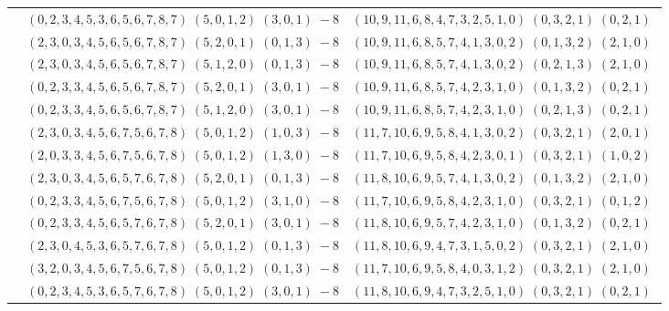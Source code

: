 \documentclass[11pt]{article}
\begin{document}
\begin{longtable}[l]{|c|c|c|}
 \cline{2-3} 
 & $(0 ,2 ,3 ,4 ,5 ,3 ,6 ,5 ,6 ,7 ,8 ,7) \;(5 ,0 ,1 ,2) \;(3 ,0 ,1) \;-8$ & $(10 ,9 ,11 ,6 ,8 ,4 ,7 ,3 ,2 ,5 ,1 ,0) \;(0 ,3 ,2 ,1) \;(0 ,2 ,1) \;$\\ 
 \cline{2-3} 
 & $(2 ,3 ,0 ,3 ,4 ,5 ,6 ,5 ,6 ,7 ,8 ,7) \;(5 ,2 ,0 ,1) \;(0 ,1 ,3) \;-8$ & $(10 ,9 ,11 ,6 ,8 ,5 ,7 ,4 ,1 ,3 ,0 ,2) \;(0 ,1 ,3 ,2) \;(2 ,1 ,0) \;$\\ 
 \cline{2-3} 
 & $(2 ,3 ,0 ,3 ,4 ,5 ,6 ,5 ,6 ,7 ,8 ,7) \;(5 ,1 ,2 ,0) \;(0 ,1 ,3) \;-8$ & $(10 ,9 ,11 ,6 ,8 ,5 ,7 ,4 ,1 ,3 ,0 ,2) \;(0 ,2 ,1 ,3) \;(2 ,1 ,0) \;$\\ 
 \cline{2-3} 
 & $(0 ,2 ,3 ,3 ,4 ,5 ,6 ,5 ,6 ,7 ,8 ,7) \;(5 ,2 ,0 ,1) \;(3 ,0 ,1) \;-8$ & $(10 ,9 ,11 ,6 ,8 ,5 ,7 ,4 ,2 ,3 ,1 ,0) \;(0 ,1 ,3 ,2) \;(0 ,2 ,1) \;$\\ 
 \cline{2-3} 
 & $(0 ,2 ,3 ,3 ,4 ,5 ,6 ,5 ,6 ,7 ,8 ,7) \;(5 ,1 ,2 ,0) \;(3 ,0 ,1) \;-8$ & $(10 ,9 ,11 ,6 ,8 ,5 ,7 ,4 ,2 ,3 ,1 ,0) \;(0 ,2 ,1 ,3) \;(0 ,2 ,1) \;$\\ 
 \cline{2-3} 
 & $(2 ,3 ,0 ,3 ,4 ,5 ,6 ,7 ,5 ,6 ,7 ,8) \;(5 ,0 ,1 ,2) \;(1 ,0 ,3) \;-8$ & $(11 ,7 ,10 ,6 ,9 ,5 ,8 ,4 ,1 ,3 ,0 ,2) \;(0 ,3 ,2 ,1) \;(2 ,0 ,1) \;$\\ 
 \cline{2-3} 
 & $(2 ,0 ,3 ,3 ,4 ,5 ,6 ,7 ,5 ,6 ,7 ,8) \;(5 ,0 ,1 ,2) \;(1 ,3 ,0) \;-8$ & $(11 ,7 ,10 ,6 ,9 ,5 ,8 ,4 ,2 ,3 ,0 ,1) \;(0 ,3 ,2 ,1) \;(1 ,0 ,2) \;$\\ 
 \cline{2-3} 
 & $(2 ,3 ,0 ,3 ,4 ,5 ,6 ,5 ,7 ,6 ,7 ,8) \;(5 ,2 ,0 ,1) \;(0 ,1 ,3) \;-8$ & $(11 ,8 ,10 ,6 ,9 ,5 ,7 ,4 ,1 ,3 ,0 ,2) \;(0 ,1 ,3 ,2) \;(2 ,1 ,0) \;$\\ 
 \cline{2-3} 
 & $(0 ,2 ,3 ,3 ,4 ,5 ,6 ,7 ,5 ,6 ,7 ,8) \;(5 ,0 ,1 ,2) \;(3 ,1 ,0) \;-8$ & $(11 ,7 ,10 ,6 ,9 ,5 ,8 ,4 ,2 ,3 ,1 ,0) \;(0 ,3 ,2 ,1) \;(0 ,1 ,2) \;$\\ 
 \cline{2-3} 
 & $(0 ,2 ,3 ,3 ,4 ,5 ,6 ,5 ,7 ,6 ,7 ,8) \;(5 ,2 ,0 ,1) \;(3 ,0 ,1) \;-8$ & $(11 ,8 ,10 ,6 ,9 ,5 ,7 ,4 ,2 ,3 ,1 ,0) \;(0 ,1 ,3 ,2) \;(0 ,2 ,1) \;$\\ 
 \cline{2-3} 
 & $(2 ,3 ,0 ,4 ,5 ,3 ,6 ,5 ,7 ,6 ,7 ,8) \;(5 ,0 ,1 ,2) \;(0 ,1 ,3) \;-8$ & $(11 ,8 ,10 ,6 ,9 ,4 ,7 ,3 ,1 ,5 ,0 ,2) \;(0 ,3 ,2 ,1) \;(2 ,1 ,0) \;$\\ 
 \cline{2-3} 
 & $(3 ,2 ,0 ,3 ,4 ,5 ,6 ,7 ,5 ,6 ,7 ,8) \;(5 ,0 ,1 ,2) \;(0 ,1 ,3) \;-8$ & $(11 ,7 ,10 ,6 ,9 ,5 ,8 ,4 ,0 ,3 ,1 ,2) \;(0 ,3 ,2 ,1) \;(2 ,1 ,0) \;$\\ 
 \cline{2-3} 
 & $(0 ,2 ,3 ,4 ,5 ,3 ,6 ,5 ,7 ,6 ,7 ,8) \;(5 ,0 ,1 ,2) \;(3 ,0 ,1) \;-8$ & $(11 ,8 ,10 ,6 ,9 ,4 ,7 ,3 ,2 ,5 ,1 ,0) \;(0 ,3 ,2 ,1) \;(0 ,2 ,1) \;$\\ 

\end{longtable}
\end{document}
